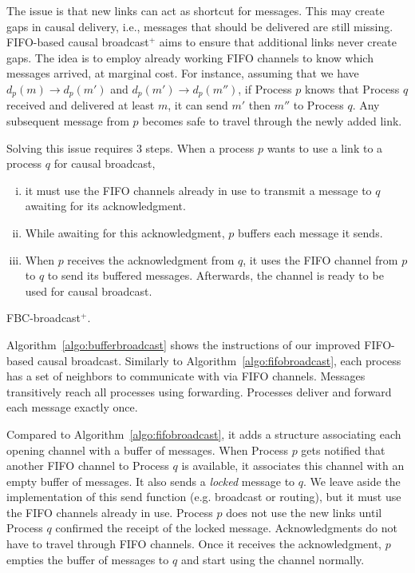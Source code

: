 The issue is that new links can act as shortcut for messages. This may create
gaps in causal delivery, i.e., messages that should be delivered are still
missing.  FIFO-based causal broadcast$^+$ aims to ensure that additional links
never create gaps. The idea is to employ already working FIFO channels to know
which messages arrived, at marginal cost. For instance, assuming that we have
$d_p(m) \rightarrow d_p(m')$ and $d_p(m') \rightarrow d_p(m'')$, if Process $p$
knows that Process $q$ received and delivered at least $m$, it can send $m'$
then $m''$ to Process $q$. Any subsequent message from $p$ becomes safe to
travel through the newly added link.



Solving this issue requires 3 steps. When a process $p$ wants to use a link to a
process $q$ for causal broadcast,
\begin{enumerate}[(i)]
\item it must use the FIFO channels already in use to transmit a message to $q$
  awaiting for its acknowledgment.
\item While awaiting for this acknowledgment, $p$ buffers each message it
  sends.
\item When $p$ receives the acknowledgment from $q$, it uses the FIFO channel
  from $p$ to $q$ to send its buffered messages. Afterwards, the channel is
  ready to be used for causal broadcast.
\end{enumerate}

\begin{algorithm}[h]
  
  \caption{\label{algo:bufferbroadcast}FBC-broadcast$^+$.}
\end{algorithm}


Algorithm~\ref{algo:bufferbroadcast} shows the instructions of our improved
FIFO-based causal broadcast. Similarly to Algorithm~\ref{algo:fifobroadcast},
each process has a set of neighbors to communicate with via FIFO
channels. Messages transitively reach all processes using forwarding. Processes
deliver and forward each message exactly once.  

Compared to Algorithm~\ref{algo:fifobroadcast}, it adds a structure associating
each opening channel with a buffer of messages. When Process $p$ gets notified
that another FIFO channel to Process $q$ is available, it associates this
channel with an empty buffer of messages. It also sends a \emph{locked} message
to $q$. We leave aside the implementation of this send function (e.g. broadcast
or routing), but it must use the FIFO channels already in use.  Process $p$ does
not use the new links until Process $q$ confirmed the receipt of the locked
message. Acknowledgments do not have to travel through FIFO channels.  Once it
receives the acknowledgment, $p$ empties the buffer of messages to $q$ and start
using the channel normally.

